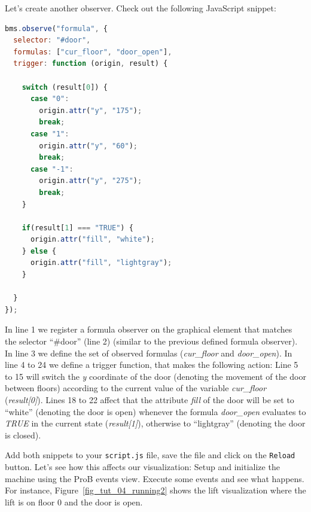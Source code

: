 Let's create another observer.
Check out the following JavaScript snippet:

\begin{lstlisting}[language=JavaScript, caption={Formula Observer for the Lift Door (JavaScript)}]
bms.observe("formula", {
  selector: "#door",
  formulas: ["cur_floor", "door_open"],
  trigger: function (origin, result) {
    
    switch (result[0]) {
      case "0":
        origin.attr("y", "175");
        break;
      case "1":
        origin.attr("y", "60");
        break;
      case "-1":
        origin.attr("y", "275");
        break;
    }
    
    if(result[1] === "TRUE") {
      origin.attr("fill", "white");
    } else {
      origin.attr("fill", "lightgray");
    }
    
  }
});
\end{lstlisting}

In line 1 we register a formula observer on the graphical element that matches the selector ``\#door'' (line 2) (similar to the previous defined formula observer).
In line 3 we define the set of observed formulas (\textit{cur\_floor} and \textit{door\_open}).
In line 4 to 24 we define a trigger function, that makes the following action:
Line 5 to 15 will switch the \textit{y} coordinate of the door (denoting the movement of the door between floors) according to the current value of the variable \textit{cur\_floor} (\textit{result[0]}).
Lines 18 to 22 affect that the attribute \textit{fill} of the door will be set to ``white'' (denoting the door is open) whenever the formula \textit{door\_open} evaluates to \textit{TRUE} in the current state (\textit{result[1]}), otherwise to ``lightgray'' (denoting the door is closed).

Add both snippets to your \texttt{script.js} file, save the file and click on the \texttt{Reload} button.
Let's see how this affects our visualization:
Setup and initialize the machine using the ProB events view.
Execute some events and see what happens.
For instance, Figure~\ref{fig_tut_04_running2} shows the lift visualization where the lift is on floor 0 and the door is open.

